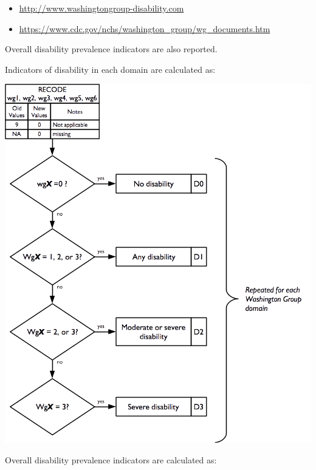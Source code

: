 \documentclass[12pt,a4paper]{book}
\theoremstyle{definition}
\theoremstyle{definition}
\theoremstyle{definition}
\theoremstyle{remark}
\begin{document}
\begin{itemize}
\item
  \url{http://www.washingtongroup-disability.com}
\item
  \url{https://www.cdc.gov/nchs/washington_group/wg_documents.htm}
\end{itemize}

Overall disability prevalence indicators are also reported.

Indicators of disability in each domain are calculated as:

\begin{center}\includegraphics[width=800pt]{figures/indicators16} \end{center}

Overall disability prevalence indicators are calculated as:
\end{document}
